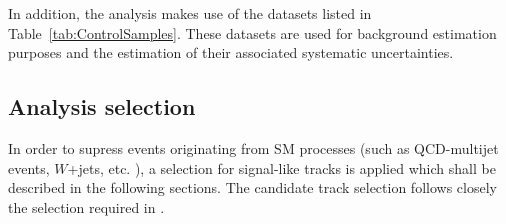 In addition, the analysis makes use of the datasets listed in Table~\ref{tab:ControlSamples}.
These datasets are used for background estimation purposes and the estimation of their associated systematic uncertainties.
\renewcommand{\arraystretch}{1.5}
\begin{table}[!hbt]
\centering
\caption{Further datasets used for background estimation.}
\label{tab:ControlSamples}
\end{table}  
\subsection{Analysis selection}

In order to supress events originating from SM processes (such as QCD-multijet events, $W$+jets, etc. ), a selection for signal-like tracks is applied which shall be described in the following sections.
The candidate track selection follows closely the selection required in \cite{bib:CMS:DT_8TeV}.\\


